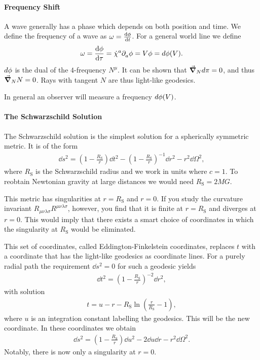 \paragraph{Frequency Shift}
A wave generally has a phase which depends on both position and time. We define the frequency of a wave as $\omega = \dv{\phi}{t}$. For a general world line we define
\begin{align*}
	\omega = \dv{\phi}{\tau} = \dot{\chi}^{a}\partial^{}_{a}\phi = V\phi = d\phi(V).
\end{align*}
$d\phi$ is the dual of the $4$-frequency $N^{\mu}$. It can be shown that $\grad_{N}{d\pi} = 0$, and thus $\grad_{N}{N} = 0$. Rays with tangent $N$ are thus light-like geodesics.

In general an observer will measure a frequency $d\phi(V)$.

\paragraph{The Schwarzschild Solution}
The Schwarzschild solution is the simplest solution for a spherically symmetric metric. It is of the form
\begin{align*}
	\dd{s}^{2} = \left(1 - \frac{R_{\text{S}}}{r}\right)\dd{t}^{2} - \left(1 - \frac{R_{\text{S}}}{r}\right)^{-1}\dd{r}^{2} - r^{2}\dd{\Omega}^{2},
\end{align*}
where $R_{\text{S}}$ is the Schwarzschild radius and we work in units where $c = 1$. To reobtain Newtonian gravity at large distances we would need $R_{\text{S}} = 2MG$.

This metric has singularities at $r = R_{\text{S}}$ and $r = 0$. If you study the curvature invariant $R_{\mu\nu\lambda\sigma}R^{\mu\nu\lambda\sigma}$, however, you find that it is finite at $r = R_{\text{S}}$ and diverges at $r = 0$. This would imply that there exists a smart choice of coordinates in which the singularity at $R_{\text{S}}$ would be eliminated.

This set of coordinates, called Eddington-Finkelstein coordinates, replaces $t$ with a coordinate that has the light-like geodesics as coordinate lines. For a purely radial path the requirement $\dd{s}^{2} = 0$ for such a geodesic yields
\begin{align*}
	\dd{t}^{2} = \left(1 - \frac{R_{\text{S}}}{r}\right)^{-2}\dd{r}^{2},
\end{align*}
with solution
\begin{align*}
	t = u - r - R_{\text{S}}\ln(\frac{r}{R_{\text{S}}} - 1),
\end{align*}
where $u$ is an integration constant labelling the geodesics. This will be the new coordinate. In these coordinates we obtain
\begin{align*}
	\dd{s}^{2} = \left(1 - \frac{R_{\text{S}}}{r}\right)\dd{u}^{2} - 2\dd{u}\dd{r} - r^{2}\dd{\Omega}^{2}.
\end{align*}
Notably, there is now only a singularity at $r = 0$.

